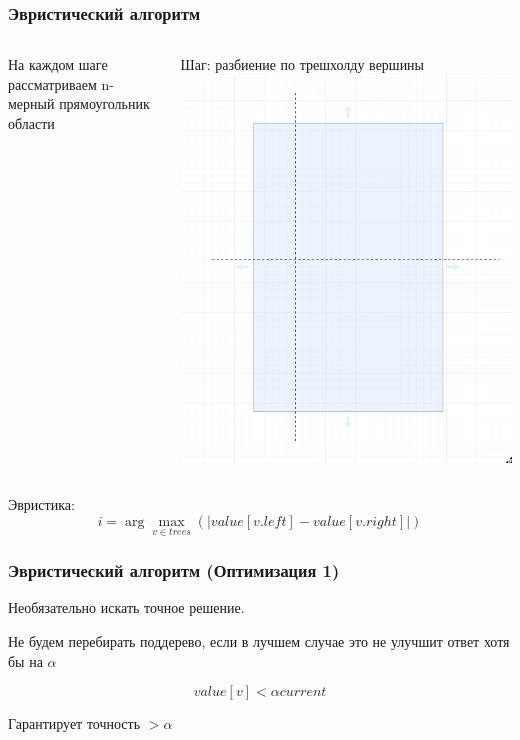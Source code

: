 \documentclass{beamer}
\begin{document}
\begin{frame}
    \frametitle{Эвристический алгоритм}

    \begin{columns}
            На каждом шаге рассматриваем n-мерный прямоугольник области

            Шаг: разбиение по трешхолду вершины
            \includegraphics[width=\textwidth]{split.png}
    \end{columns}
    \vfill
    \pause{}
    Эвристика:
    \[
        i = \arg \max_{v \in trees}(|value[v.left] - value[v.right]|)
    \]
\end{frame}

\begin{frame}
    \frametitle{Эвристический алгоритм (Оптимизация 1)}
    Необязательно искать точное решение.

    \vspace{50px}
    Не будем перебирать поддерево, если в лучшем случае это не улучшит ответ хотя бы на $\alpha$

    \[
        value[v] < \alpha current
    \]

    Гарантирует точность $>\alpha$
\end{frame}
\end{document}
